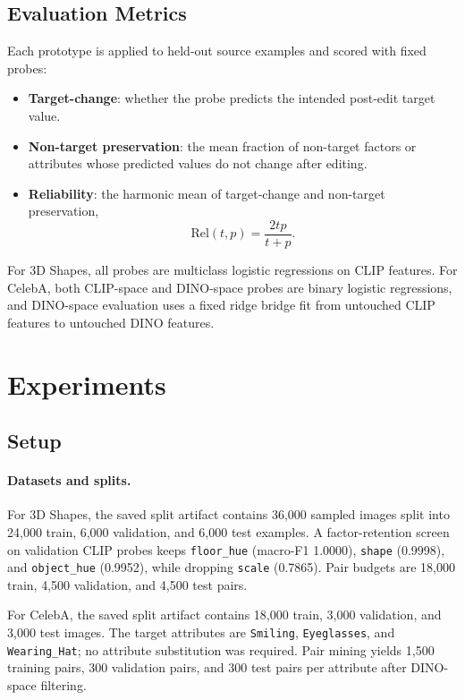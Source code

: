 \documentclass{article}
\begin{document}
\subsection{Evaluation Metrics}

Each prototype is applied to held-out source examples and scored with fixed probes:
\begin{itemize}
  \item \textbf{Target-change}: whether the probe predicts the intended post-edit target value.
  \item \textbf{Non-target preservation}: the mean fraction of non-target factors or attributes whose predicted values do not change after editing.
  \item \textbf{Reliability}: the harmonic mean of target-change and non-target preservation,
  \[
  \mathrm{Rel}(t,p) = \frac{2tp}{t+p}.
  \]
\end{itemize}

For 3D Shapes, all probes are multiclass logistic regressions on CLIP features. For CelebA, both CLIP-space and DINO-space probes are binary logistic regressions, and DINO-space evaluation uses a fixed ridge bridge fit from untouched CLIP features to untouched DINO features.

\section{Experiments}
\label{sec:experiments}

\subsection{Setup}

\paragraph{Datasets and splits.}
For 3D Shapes, the saved split artifact contains 36,000 sampled images split into 24,000 train, 6,000 validation, and 6,000 test examples. A factor-retention screen on validation CLIP probes keeps \texttt{floor\_hue} (macro-F1 1.0000), \texttt{shape} (0.9998), and \texttt{object\_hue} (0.9952), while dropping \texttt{scale} (0.7865). Pair budgets are 18,000 train, 4,500 validation, and 4,500 test pairs.

For CelebA, the saved split artifact contains 18,000 train, 3,000 validation, and 3,000 test images. The target attributes are \texttt{Smiling}, \texttt{Eyeglasses}, and \texttt{Wearing\_Hat}; no attribute substitution was required. Pair mining yields 1,500 training pairs, 300 validation pairs, and 300 test pairs per attribute after DINO-space filtering.
\end{document}
